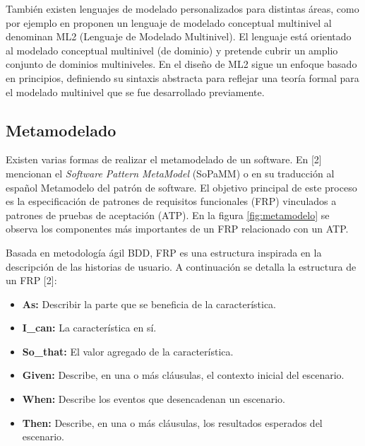También existen lenguajes de modelado personalizados para distintas áreas, como por ejemplo en \cite{Multi-level} proponen un lenguaje de modelado conceptual multinivel al denominan ML2 (Lenguaje de Modelado Multinivel). El lenguaje está orientado al modelado conceptual multinivel (de dominio) y pretende cubrir un amplio conjunto de dominios multiniveles. En el diseño de ML2 sigue un enfoque basado en principios, definiendo su sintaxis abstracta para reflejar una teoría formal para el modelado multinivel que se fue desarrollado previamente.

\subsection{Metamodelado}

Existen varias formas de realizar el metamodelado de un software. En [2] mencionan el \textit{Software Pattern MetaModel} (SoPaMM) o en su traducción al español Metamodelo del patrón de software. El objetivo principal de este proceso es la especificación de patrones de requisitos funcionales (FRP) vinculados a patrones de pruebas de aceptación (ATP). En la figura \ref{fig:metamodelo} se observa los componentes más importantes de un FRP relacionado con un ATP.

Basada en metodología ágil BDD, FRP es una estructura inspirada en la descripción de las historias de usuario. A continuación se detalla la estructura de un FRP [2]:

\begin{itemize}
	\item \textbf{As: }Describir la parte que se beneficia de la característica.
	\item \textbf{I\_can: }La característica en sí.
	\item \textbf{So\_that:} El valor agregado de la característica.
	\item \textbf{Given:} Describe, en una o más cláusulas, el contexto inicial del escenario.
	\item \textbf{When:} Describe los eventos que desencadenan un escenario.
	\item \textbf{Then:} Describe, en una o más cláusulas, los resultados esperados del escenario.
\end{itemize}

